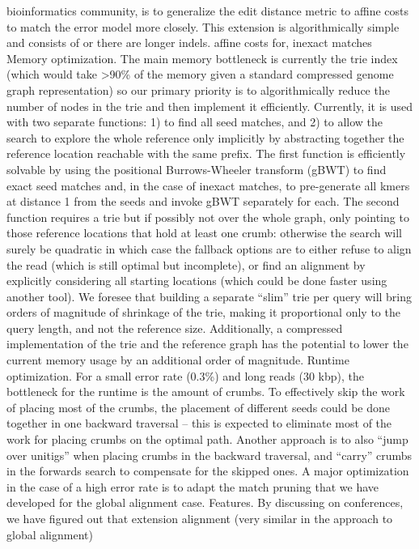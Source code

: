 bioinformatics community, is to generalize the edit distance metric to affine
costs to match the error model more closely. This extension is algorithmically
simple and consists of or there are longer indels. affine costs for, inexact
matches Memory optimization. The main memory bottleneck is currently the trie
index (which would take >90\% of the memory given a standard compressed genome
graph representation) so our primary priority is to algorithmically reduce the
number of nodes in the trie and then implement it efficiently. Currently, it is
used with two separate functions: 1) to find all seed matches, and 2) to allow
the search \A to explore the whole reference only implicitly by abstracting
together the reference location reachable with the same prefix. The first
function is efficiently solvable by using the positional Burrows-Wheeler
transform (gBWT) to find exact seed matches and, in the case of inexact matches,
to pre-generate all kmers at distance 1 from the seeds and invoke gBWT
separately for each. The second function requires a trie but if possibly not 
over the whole graph, only pointing to those reference locations that hold at
least one crumb: otherwise the \A search will surely be quadratic in which case
the fallback options are to either refuse to align the read (which is still
optimal but incomplete), or find an alignment by explicitly considering all
starting locations (which could be done faster using another tool). We foresee
that building a separate “slim” trie per query will bring orders of magnitude of
shrinkage of the trie, making it proportional only to the query length, and not
the reference size. Additionally, a compressed implementation of the trie and
the reference graph has the potential to lower the current memory usage by an
additional order of magnitude. Runtime optimization. For a small error rate
(0.3\%) and long reads (30 kbp), the bottleneck for the runtime is the amount of
crumbs. To effectively skip the work of placing most of the crumbs, the
placement of different seeds could be done together in one backward traversal –
this is expected to eliminate most of the work for placing crumbs on the optimal
path.  Another approach is to also ``jump over unitigs'' when placing crumbs in
the backward traversal, and ``carry'' crumbs in the forwards \A search to
compensate for the skipped ones. A major optimization in the case of a high
error rate is to adapt the match pruning that we have developed for the global
alignment case. Features. By discussing \astarix on conferences, we have figured
out that extension alignment (very similar in the approach to global alignment)
